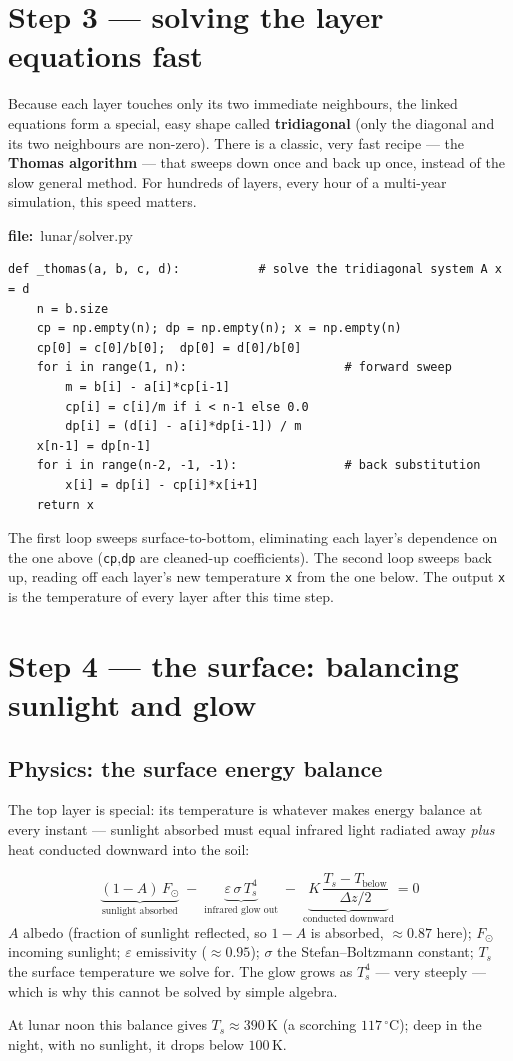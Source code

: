 \documentclass[11pt]{article}
\newcommand{\codefile}[1]{\par\smallskip\noindent
  {\footnotesize\ttfamily\color{teal!55!black}\textbf{file:}~#1}\par\nopagebreak}
\renewcommand{\codefile}[1]{\par\smallskip\noindent
    {\footnotesize\ttfamily\color{black}\textbf{file:}~#1}\par\nopagebreak}
\begin{document}
\section{Step 3 --- solving the layer equations fast}
Because each layer touches only its two immediate neighbours, the linked
equations form a special, easy shape called \textbf{tridiagonal} (only
the diagonal and its two neighbours are non-zero). There is a classic,
very fast recipe --- the \textbf{Thomas algorithm} --- that sweeps down
once and back up once, instead of the slow general method. For hundreds
of layers, every hour of a multi-year simulation, this speed matters.
\codefile{lunar/solver.py}
\begin{lstlisting}
def _thomas(a, b, c, d):           # solve the tridiagonal system A x = d
    n = b.size
    cp = np.empty(n); dp = np.empty(n); x = np.empty(n)
    cp[0] = c[0]/b[0];  dp[0] = d[0]/b[0]
    for i in range(1, n):                      # forward sweep
        m = b[i] - a[i]*cp[i-1]
        cp[i] = c[i]/m if i < n-1 else 0.0
        dp[i] = (d[i] - a[i]*dp[i-1]) / m
    x[n-1] = dp[n-1]
    for i in range(n-2, -1, -1):               # back substitution
        x[i] = dp[i] - cp[i]*x[i+1]
    return x
\end{lstlisting}
\begin{codebox}
The first loop sweeps surface-to-bottom, eliminating each layer's
dependence on the one above (\texttt{cp},\texttt{dp} are cleaned-up
coefficients). The second loop sweeps back up, reading off each layer's
new temperature \texttt{x} from the one below. The output \texttt{x} is
the temperature of every layer after this time step.
\end{codebox}

\section{Step 4 --- the surface: balancing sunlight and glow}
\subsection{Physics: the surface energy balance}
The top layer is special: its temperature is whatever makes energy
balance at every instant --- sunlight absorbed must equal infrared light
radiated away \emph{plus} heat conducted downward into the soil:
\begin{mathbox}
\[
\underbrace{(1-A)\,F_\odot}_{\text{sunlight absorbed}}
\;-\;
\underbrace{\varepsilon\,\sigma\,T_s^4}_{\text{infrared glow out}}
\;-\;
\underbrace{K\,\dfrac{T_s - T_\text{below}}{\Delta z/2}}_{\text{conducted downward}}
= 0
\]
\textbf{$A$} albedo (fraction of sunlight reflected, so $1-A$ is
absorbed, $\approx0.87$ here); \textbf{$F_\odot$} incoming sunlight;
\textbf{$\varepsilon$} emissivity ($\approx0.95$); \textbf{$\sigma$} the
Stefan--Boltzmann constant; \textbf{$T_s$} the surface temperature we
solve for. The glow grows as $T_s^4$ --- very steeply --- which is why
this cannot be solved by simple algebra.
\end{mathbox}
At lunar noon this balance gives $T_s\approx390\,$K (a scorching
$117\,^\circ$C); deep in the night, with no sunlight, it drops below
$100\,$K.
\end{document}

